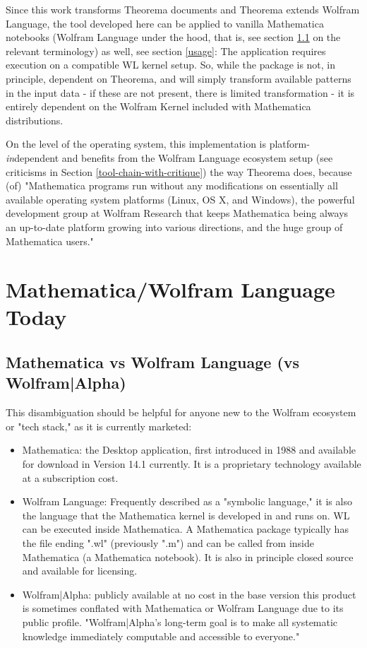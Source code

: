 Since this work transforms Theorema documents and Theorema extends Wolfram Language, the tool developed here can be applied to vanilla Mathematica notebooks (Wolfram Language under the hood, that is, see section \ref{mm-vs-wl} on the relevant terminology) as well, see section \ref{usage}: The application requires execution on a compatible WL kernel setup. So, while the package is not, in principle, dependent on Theorema, and will simply transform available patterns in the input data - if these are not present, there is limited transformation - it is entirely dependent on the Wolfram Kernel included with Mathematica distributions.

On the level of the operating system, this implementation is platform-\textit{in}dependent and benefits from the Wolfram Language ecosystem setup (see criticisms in Section \ref{tool-chain-with-critique}) the way Theorema does, because (of) "Mathematica programs run without any modifications on essentially all available operating system platforms (Linux, OS X, and Windows), the powerful development group at Wolfram Research that keeps Mathematica being always an up-to-date platform growing into various directions, and the huge group of Mathematica users." \cite[p. 72]{windsteiger_theorema_2013}

\section{Mathematica/Wolfram Language Today}

\subsection{Mathematica vs Wolfram Language (vs Wolfram|Alpha)} \label{mm-vs-wl}

This disambiguation should be helpful for anyone new to the Wolfram ecosystem or "tech stack," as it is currently marketed: \cite{noauthor_wolfram_nodate}

\begin{itemize}
    \item Mathematica: the Desktop application, first introduced in 1988 and available for download in Version 14.1 currently. It is a proprietary technology available at a subscription cost. \cite{noauthor_wolfram_nodate-1}
    \item Wolfram Language: Frequently described as a "symbolic language," it is also the language that the Mathematica kernel is developed in and runs on. WL can be executed inside Mathematica. A Mathematica package typically has the file ending ".wl" (previously ".m") and can be called from inside Mathematica (a Mathematica notebook). It is also in principle closed source \cite{noauthor_wolfram_nodate} and available for licensing.
    \item Wolfram|Alpha: publicly available at no cost in the base version \cite{noauthor_wolframalpha_nodate} this product is sometimes conflated with Mathematica or Wolfram Language due to its public profile. "Wolfram|Alpha's long-term goal is to make all systematic knowledge immediately computable and accessible to everyone." \cite{wolfram_research_inc_about_2024}
\end{itemize}


